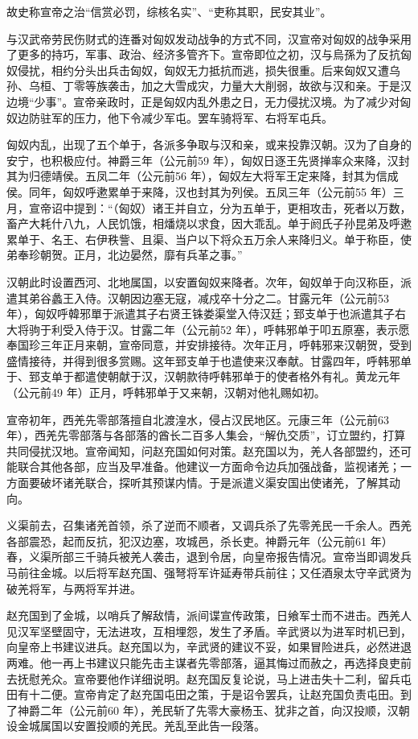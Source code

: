 故史称宣帝之治“信赏必罚，综核名实”、“吏称其职，民安其业”。

与汉武帝劳民伤财式的连番对匈奴发动战争的方式不同，汉宣帝对匈奴的战争采用了更多的持巧，军事、政治、经济多管齐下。宣帝即位之初，汉与烏孫为了反抗匈奴侵扰，相约分头出兵击匈奴，匈奴无力抵抗而逃，损失很重。后来匈奴又遭乌孙、乌桓、丁零等族袭击，加之大雪成灾，力量大大削弱，故欲与汉和亲。于是汉边境“少事”。宣帝亲政时，正是匈奴内乱外患之日，无力侵扰汉境。为了减少对匈奴边防驻军的压力，他下令减少军屯。罢车骑将军、右将军屯兵。

匈奴内乱，出现了五个单于，各派多争取与汉和亲，或来投靠汉朝。汉为了自身的安宁，也积极应付。神爵三年（公元前59 年），匈奴日逐王先贤掸率众来降，汉封其为归德靖侯。五凤二年（公元前56 年），匈奴左大将军王定来降，封其为信成侯。同年，匈奴呼遬累单于来降，汉也封其为列侯。五凤三年（公元前55 年）三月，宣帝诏中提到：“（匈奴）诸王并自立，分为五单于，更相攻击，死者以万数，畜产大耗什八九，人民饥饿，相燔烧以求食，因大乖乱。单于阏氏子孙昆弟及呼遬累单于、名王、右伊秩訾、且渠、当户以下将众五万余人来降归义。单于称臣，使弟奉珍朝贺。正月，北边晏然，靡有兵革之事。”

汉朝此时设置西河、北地属国，以安置匈奴来降者。次年，匈奴单于向汉称臣，派遣其弟谷蠡王入侍。汉朝因边塞无寇，减戍卒十分之二。甘露元年（公元前53 年），匈奴呼韓邪單于派遣其子右贤王铢娄渠堂入侍汉廷；郅支单于也派遣其子右大将驹于利受入侍于汉。甘露二年（公元前52 年），呼韩邪单于叩五原塞，表示愿奉国珍三年正月来朝，宣帝同意，并安排接待。次年正月，呼韩邪来汉朝贺，受到盛情接待，并得到很多赏赐。这年郅支单于也遣使来汉奉献。甘露四年，呼韩邪单于、郅支单于都遣使朝献于汉，汉朝款待呼韩邪单于的使者格外有礼。黄龙元年（公元前49 年）正月，呼韩邪单于又来朝，汉朝对他礼赐如初。

宣帝初年，西羌先零部落擅自北渡湟水，侵占汉民地区。元康三年（公元前63年），西羌先零部落与各部落的酋长二百多人集会，“解仇交质”，订立盟约，打算共同侵扰汉地。宣帝闻知，问赵充国如何对策。赵充国以为，羌人各部盟约，还可能联合其他各部，应当及早准备。他建议一方面命令边兵加强战备，监视诸羌；一方面要破坏诸羌联合，探听其预谋内情。于是派遣义渠安国出使诸羌，了解其动向。

义渠前去，召集诸羌首领，杀了逆而不顺者，又调兵杀了先零羌民一千余人。西羌各部震恐，起而反抗，犯汉边塞，攻城邑，杀长吏。神爵元年（公元前61 年）春，义渠所部三千骑兵被羌人袭击，退到令居，向皇帝报告情况。宣帝当即调发兵马前往金城。以后将军赵充国、强弩将军许延寿带兵前往；又任酒泉太守辛武贤为破羌将军，与两将军并进。

赵充国到了金城，以哨兵了解敌情，派间谍宣传政策，日飨军士而不进击。西羌人见汉军坚壁固守，无法进攻，互相埋怨，发生了矛盾。辛武贤以为进军时机已到，向皇帝上书建议进兵。赵充国以为，辛武贤的建议不妥，如果冒险进兵，必然进退两难。他一再上书建议只能先击主谋者先零部落，逼其悔过而赦之，再选择良吏前去抚慰羌众。宣帝要他作详细说明。赵充国反复论说，马上进击失十二利，留兵屯田有十二便。宣帝肯定了赵充国屯田之策，于是诏令罢兵，让赵充国负责屯田。到了神爵二年（公元前60 年），羌民斩了先零大豪杨玉、犹非之首，向汉投顺，汉朝设金城属国以安置投顺的羌民。羌乱至此告一段落。

